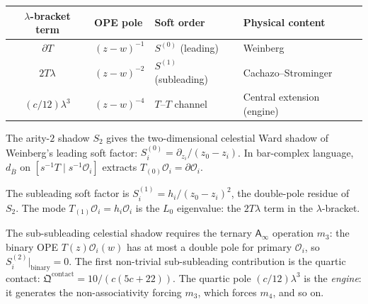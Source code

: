 \documentclass[11pt]{article}
\newcommand{\cO}{\mathcal{O}}
\newcommand{\barB}{\overline{B}}
\newcommand{\Ainf}{\mathsf{A}_{\infty}}
\begin{document}
\begin{center}
\renewcommand{\arraystretch}{1.2}
\begin{tabular}{clll}
\textbf{$\lambda$-bracket term} &
\textbf{OPE pole} &
\textbf{Soft order} &
\textbf{Physical content} \\
\hline
$\partial T$ & $(z{-}w)^{-1}$ & $S^{(0)}$ (leading) &
  Weinberg \\[2pt]
$2T\lambda$ & $(z{-}w)^{-2}$ & $S^{(1)}$ (subleading) &
  Cachazo--Strominger \\[2pt]
$(c/12)\lambda^3$ & $(z{-}w)^{-4}$ &
  $T$--$T$ channel & Central extension (engine)
\end{tabular}
\end{center}

\begin{proposition}
\label{thm:weinberg-from-bar}
The arity-$2$ shadow $S_2$ gives the two-dimensional celestial
Ward shadow of Weinberg's leading soft factor:
$S^{(0)}_i = \partial_{z_i}/(z_0 - z_i)$.
In bar-complex language, $d_{\barB}$ on $[s^{-1}T \mid s^{-1}\cO_i]$
extracts $T_{(0)}\cO_i = \partial\cO_i$.
\end{proposition}

\begin{proposition}
\label{thm:cs-subleading-from-bar}
The subleading soft factor is $S^{(1)}_i = h_i/(z_0 - z_i)^2$,
the double-pole residue of $S_2$.  The mode $T_{(1)}\cO_i = h_i\cO_i$
is the $L_0$ eigenvalue: the $2T\lambda$ term in the $\lambda$-bracket.
\end{proposition}

\begin{proposition}
\label{thm:sub-subleading-m3}
The sub-subleading celestial shadow requires the ternary $\Ainf$
operation $m_3$: the binary OPE $T(z)\cO_i(w)$ has at most a double
pole for primary $\cO_i$, so $S^{(2)}_i|_{\text{binary}} = 0$.
The first non-trivial sub-subleading contribution is the quartic
contact: $\mathfrak{Q}^{\mathrm{contact}} = 10/(c(5c+22))$.
The quartic pole $(c/12)\lambda^3$ is the \emph{engine}: it generates
the non-associativity forcing $m_3$, which forces $m_4$, and so on.
\end{proposition}
\end{document}
